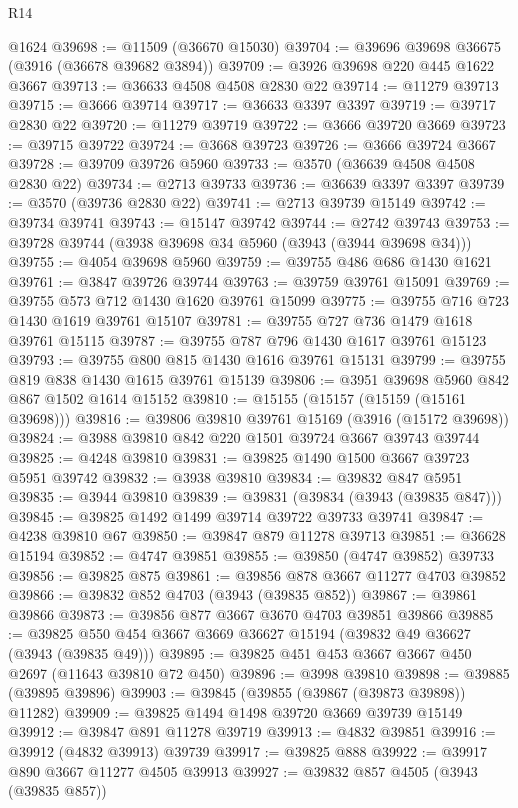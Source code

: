 \begin{lexlean}{R14}
\begin{coremodule}
    @1624
@39698 := @11509 (@36670 @15030)
@39704 := @39696 @39698 @36675 (@3916 (@36678 @39682 @3894))
@39709 := @3926 @39698 @220 @445 @1622 @3667
@39713 := @36633 @4508 @4508 @2830 @22
@39714 := @11279 @39713
@39715 := @3666 @39714
@39717 := @36633 @3397 @3397
@39719 := @39717 @2830 @22
@39720 := @11279 @39719
@39722 := @3666 @39720 @3669
@39723 := @39715 @39722
@39724 := @3668 @39723
@39726 := @3666 @39724 @3667
@39728 := @39709 @39726 @5960
@39733 := @3570 (@36639 @4508 @4508 @2830 @22)
@39734 := @2713 @39733
@39736 := @36639 @3397 @3397
@39739 := @3570 (@39736 @2830 @22)
@39741 := @2713 @39739 @15149
@39742 := @39734 @39741
@39743 := @15147 @39742
@39744 := @2742 @39743
@39753 := @39728 @39744 (@3938 @39698 @34 @5960 (@3943 (@3944 @39698 @34)))
@39755 := @4054 @39698 @5960
@39759 := @39755 @486 @686 @1430 @1621
@39761 := @3847 @39726 @39744
@39763 := @39759 @39761 @15091
@39769 := @39755 @573 @712 @1430 @1620 @39761 @15099
@39775 := @39755 @716 @723 @1430 @1619 @39761 @15107
@39781 := @39755 @727 @736 @1479 @1618 @39761 @15115
@39787 := @39755 @787 @796 @1430 @1617 @39761 @15123
@39793 := @39755 @800 @815 @1430 @1616 @39761 @15131
@39799 := @39755 @819 @838 @1430 @1615 @39761 @15139
@39806 := @3951 @39698 @5960 @842 @867 @1502 @1614 @15152
@39810 := @15155 (@15157 (@15159 (@15161 @39698)))
@39816 := @39806 @39810 @39761 @15169 (@3916 (@15172 @39698))
@39824 := @3988 @39810 @842 @220 @1501 @39724 @3667 @39743 @39744
@39825 := @4248 @39810
@39831 := @39825 @1490 @1500 @3667 @39723 @5951 @39742
@39832 := @3938 @39810
@39834 := @39832 @847 @5951
@39835 := @3944 @39810
@39839 := @39831 (@39834 (@3943 (@39835 @847)))
@39845 := @39825 @1492 @1499 @39714 @39722 @39733 @39741
@39847 := @4238 @39810 @67
@39850 := @39847 @879 @11278 @39713
@39851 := @36628 @15194
@39852 := @4747 @39851
@39855 := @39850 (@4747 @39852) @39733
@39856 := @39825 @875
@39861 := @39856 @878 @3667 @11277 @4703 @39852
@39866 := @39832 @852 @4703 (@3943 (@39835 @852))
@39867 := @39861 @39866
@39873 := @39856 @877 @3667 @3670 @4703 @39851 @39866
@39885 := @39825 @550 @454 @3667 @3669 @36627 @15194 (@39832 @49 @36627 (@3943 (@39835 @49)))
@39895 := @39825 @451 @453 @3667 @3667 @450 @2697 (@11643 @39810 @72 @450)
@39896 := @3998 @39810
@39898 := @39885 (@39895 @39896)
@39903 := @39845 (@39855 (@39867 (@39873 @39898)) @11282)
@39909 := @39825 @1494 @1498 @39720 @3669 @39739 @15149
@39912 := @39847 @891 @11278 @39719
@39913 := @4832 @39851
@39916 := @39912 (@4832 @39913) @39739
@39917 := @39825 @888
@39922 := @39917 @890 @3667 @11277 @4505 @39913
@39927 := @39832 @857 @4505 (@3943 (@39835 @857))

\end{coremodule}
\end{lexlean}
